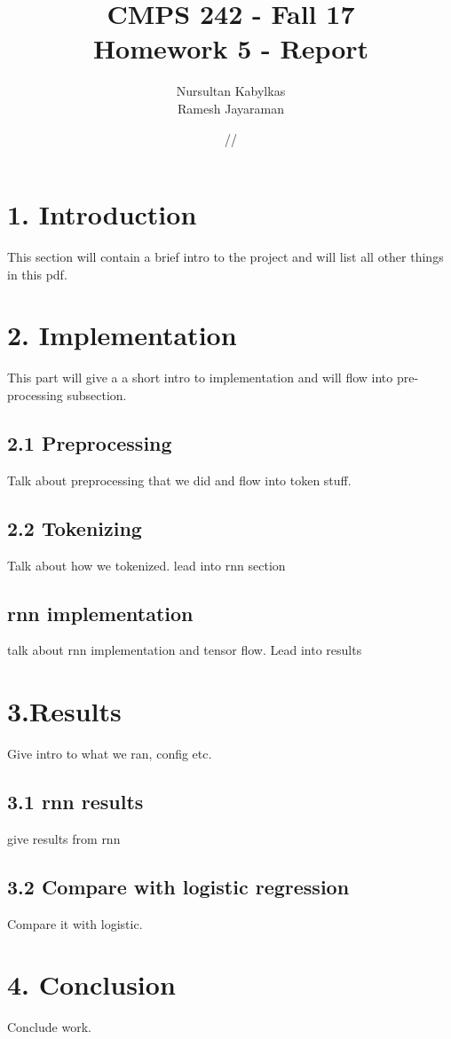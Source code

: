 \documentclass[12pt]{report}
\title{\textbf{CMPS 242 - Fall 17 \\Homework 5 - Report\\ }}
\author{Nursultan Kabylkas\\ Ramesh Jayaraman \\}
\date{\oldstylenums{11}/\oldstylenums{17}/\oldstylenums{2017}}
\begin{document}
\maketitle

\pagebreak
 
\section*{1. Introduction} 

This section will contain a brief intro to the project and will list all other things in this pdf.

\section*{2. Implementation}

This part will give a a short intro to implementation and will flow into pre-processing subsection.

\subsection*{2.1 Preprocessing }

Talk about preprocessing that we did and flow into token stuff.

\subsection*{2.2 Tokenizing}

Talk about how we tokenized. lead into rnn section

\subsection*{rnn implementation}

talk about rnn implementation and tensor flow. Lead into results

\section*{3.Results}

Give intro to what we ran, config etc.

\subsection*{3.1 rnn results}

give results from rnn

\subsection*{3.2 Compare with logistic regression}

Compare it with logistic.

\section*{4. Conclusion}
Conclude work.
\end{document}
